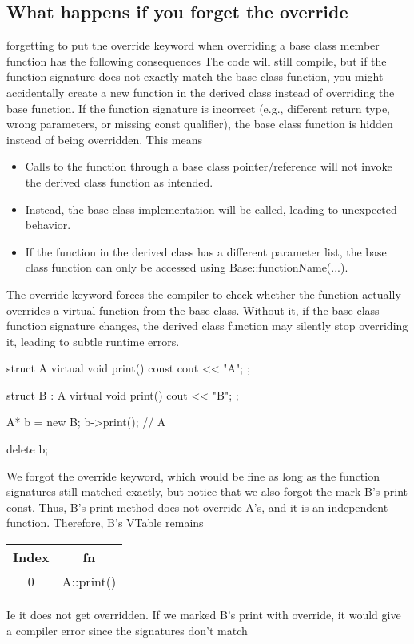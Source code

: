 \documentclass{report}
\begin{document}
    \subsection{What happens if you forget the override}
    \bigbreak \noindent 
    forgetting to put the override keyword when overriding a base class member function has the following consequences
    \bigbreak \noindent 
    The code will still compile, but if the function signature does not exactly match the base class function, you might accidentally create a new function in the derived class instead of overriding the base function.
    \bigbreak \noindent 
    If the function signature is incorrect (e.g., different return type, wrong parameters, or missing const qualifier), the base class function is hidden instead of being overridden. This means
    \begin{itemize}
        \item Calls to the function through a base class pointer/reference will not invoke the derived class function as intended.
        \item Instead, the base class implementation will be called, leading to unexpected behavior.
        \item If the function in the derived class has a different parameter list, the base class function can only be accessed using Base::functionName(...).
    \end{itemize}
    \bigbreak \noindent 
    The override keyword forces the compiler to check whether the function actually overrides a virtual function from the base class. Without it, if the base class function signature changes, the derived class function may silently stop overriding it, leading to subtle runtime errors.
    \bigbreak \noindent 
    \begin{cppcode}
    struct A {
        virtual void print() const {cout <<  "A"; }
    };

    struct B : A {
        virtual void print() {cout << "B";}
    };

    A* b = new B;
    b->print(); // A

    delete b;
    \end{cppcode}
    \bigbreak \noindent 
    We forgot the override keyword, which  would be fine as long as the function signatures still matched exactly, but notice that we also forgot the mark B's print const. Thus, B's print method does not override A's, and it is an independent function. Therefore, B's VTable remains
    \bigbreak \noindent 
    \begin{center}
        \begin{tabular}{c|c}
            Index & fn \\
            \hline 
            0 & A::print()
        \end{tabular}
    \end{center}
    Ie it does not get overridden. If we marked B's print with override, it would give a compiler error since the signatures don't match
\end{document}
